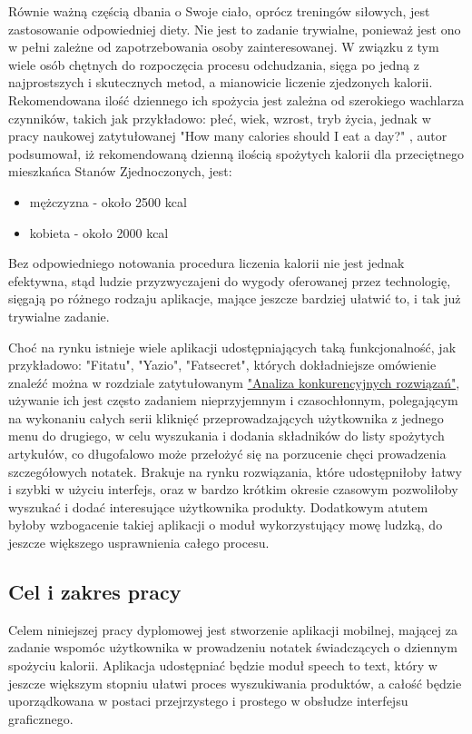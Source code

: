 \documentclass[12pt, a4paper]{article}
\begin{document}
\begin{sloppypar}
{{    Równie ważną częścią dbania o Swoje ciało, oprócz treningów siłowych, jest 
    zastosowanie odpowiedniej diety. Nie jest to zadanie trywialne, ponieważ jest 
    ono w pełni zależne od zapotrzebowania osoby zainteresowanej. W związku z tym
    wiele osób chętnych do rozpoczęcia procesu odchudzania, sięga po jedną z
    najprostszych i skutecznych metod, a mianowicie liczenie zjedzonych kalorii.
    Rekomendowana ilość dziennego ich spożycia jest zależna od szerokiego wachlarza
    czynników, takich jak przykładowo: płeć, wiek, wzrost, tryb życia, 
    jednak w pracy naukowej zatytułowanej "How many calories should I eat a day?"
    \cite{cal}, autor podsumował, iż rekomendowaną dzienną ilością spożytych kalorii 
    dla przeciętnego mieszkańca Stanów Zjednoczonych, jest:
    \begin{itemize}
      \item mężczyzna - około 2500 kcal
      \item kobieta - około 2000 kcal
    \end{itemize}
    Bez odpowiedniego notowania procedura liczenia kalorii nie jest jednak efektywna, 
    stąd ludzie przyzwyczajeni do wygody oferowanej przez technologię, sięgają po 
    różnego rodzaju aplikacje, mające jeszcze bardziej ułatwić to, i tak już trywialne
    zadanie.

    Choć na rynku istnieje wiele aplikacji udostępniających taką funkcjonalność, jak
    przykładowo: "Fitatu", "Yazio", "Fatsecret", których dokładniejsze omówienie znaleźć
    można w rozdziale zatytułowanym 
    \hyperref[sec:analysis]{"Analiza konkurencyjnych rozwiązań"},
    używanie ich jest często zadaniem nieprzyjemnym i czasochłonnym, polegającym
    na wykonaniu całych serii kliknięć przeprowadzających użytkownika z jednego menu
    do drugiego, w celu wyszukania i dodania składników do listy spożytych artykułów,
    co długofalowo może przełożyć się na porzucenie chęci prowadzenia szczegółowych
    notatek. Brakuje na rynku rozwiązania, które udostępniłoby łatwy i szybki
    w użyciu interfejs, oraz w bardzo krótkim okresie czasowym pozwoliłoby wyszukać 
    i dodać interesujące użytkownika produkty. Dodatkowym atutem byłoby wzbogacenie
    takiej aplikacji o moduł wykorzystujący mowę ludzką, do jeszcze większego 
    usprawnienia całego procesu.
  }
  \subsection{Cel i zakres pracy}
  {
    Celem niniejszej pracy dyplomowej jest stworzenie aplikacji mobilnej, mającej 
    za zadanie wspomóc użytkownika w prowadzeniu notatek świadczących o dziennym
    spożyciu kalorii. Aplikacja udostępniać będzie moduł speech to text,
    który w jeszcze większym stopniu ułatwi proces wyszukiwania produktów, a całość
    będzie uporządkowana w postaci przejrzystego i prostego w obsłudze interfejsu
    graficznego.

}}
\end{sloppypar}
\end{document}

